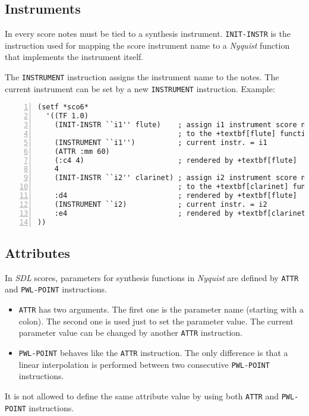  \subsection{Instruments}
In every score notes must be tied to a synthesis instrument. \texttt{INIT-INSTR} is the instruction used for mapping the score instrument name to a \textit{Nyquist} function that implements the instrument itself.\par
The \texttt{INSTRUMENT} instruction assigns the instrument name to the notes. The current instrument can be set by a new \texttt{INSTRUMENT} instruction. Example:
\begin{Verbatim}[frame=single,fontsize=\small,numbers=left,numbersep=2mm,
                 commandchars=+\[\]]
(setf *sco6*
  '((TF 1.0)                        
    (INIT-INSTR ``i1'' flute)    ; assign i1 instrument score name
                                 ; to the +textbf[flute] function
    (INSTRUMENT ``i1'')          ; current instr. = i1
    (ATTR :mm 60)                   
    (:c4 4)                      ; rendered by +textbf[flute]
    4                               
    (INIT-INSTR ``i2'' clarinet) ; assign i2 instrument score name
                                 ; to the +textbf[clarinet] function
    :d4                          ; rendered by +textbf[flute]
    (INSTRUMENT ``i2)            ; current instr. = i2
    :e4                          ; rendered by +textbf[clarinet]
))
\end{Verbatim}

\subsection{Attributes}
In \textit{SDL} scores, parameters for synthesis functions in \textit{Nyquist} are defined by \texttt{ATTR} and \texttt{PWL-POINT} instructions.\par
\begin{itemize}
  \item \texttt{ATTR} has two arguments. The first one is the parameter name (starting with a colon). The second one is used just to set the parameter value. The current parameter value can be changed by another \texttt{ATTR} instruction.
  \item \texttt{PWL-POINT} behaves like the \texttt{ATTR} instruction. The only difference is that a linear interpolation is performed between two consecutive \texttt{PWL-POINT} instructions. 
\end{itemize} 
It is not allowed to define the same attribute value by using both \texttt{ATTR} and \texttt{PWL-POINT} instructions.

